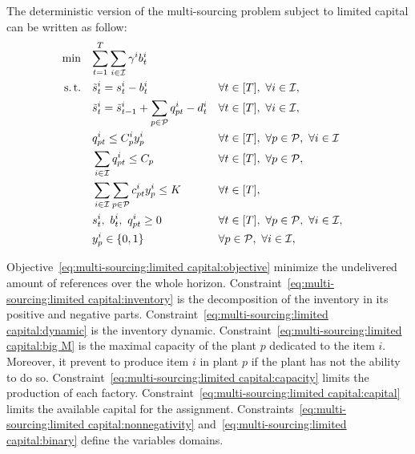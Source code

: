 The deterministic version of the multi-sourcing problem subject to limited capital can be written as follow:
\begin{subequations}\label{eq:multi-sourcing:limited capital}
  \begin{align}
    \min\quad & \rlap{$\ds \sum_{t=1}^{\horizon} \sum_{i\in\REF} \backorder^i \backlog_t^i$}
    \label{eq:multi-sourcing:limited capital:objective}
    \\
    \st\quad & \ds \level_t^i = \inventory_t^i - \backlog_t^i && \forall t\in\range{\horizon},\ \forall i\in\REF,
    \label{eq:multi-sourcing:limited capital:inventory}
    \\
    & \ds \level_t^i = \level_{t-1}^i + \sum_{p\in\plants}\quantity_{pt}^i - \demand_t^i && \forall t\in\range{\horizon},\ \forall i\in\REF,
    \label{eq:multi-sourcing:limited capital:dynamic}
    \\
    & \ds \quantity_{pt}^i \le \capacity_p^i \open_p^i && \forall t\in\range{\horizon},\ \forall p\in\plants,\ \forall i\in\REF
    \label{eq:multi-sourcing:limited capital:big M}
    \\
    & \ds \sum_{i\in\REF}\quantity_{pt}^i \le \capacity_p && \forall t\in\range{\horizon},\ \forall p\in\plants,
    \label{eq:multi-sourcing:limited capital:capacity}
    \\
    & \ds \sum_{i\in\REF} \sum_{p\in\plants}\affect_{pt}^i\open_p^i \le \capital && \forall t\in\range{\horizon},
    \label{eq:multi-sourcing:limited capital:capital}
    \\
    & \ds \inventory_t^i,\ \backlog_t^i,\ \quantity_{pt}^i \ge 0 && \forall t\in\range{\horizon},\ \forall p\in\plants,\ \forall i\in\REF,
    \label{eq:multi-sourcing:limited capital:nonnegativity}
    \\
    & \ds \open_p^i \in \crbracket{0,1} && \forall p\in\plants,\ \forall i\in\REF,
    \label{eq:multi-sourcing:limited capital:binary}
  \end{align}
\end{subequations}


Objective~\eqref{eq:multi-sourcing:limited capital:objective} minimize the undelivered amount of references over the whole horizon.
Constraint~\eqref{eq:multi-sourcing:limited capital:inventory} is the decomposition of the inventory in its positive and negative parts.
Constraint~\eqref{eq:multi-sourcing:limited capital:dynamic} is the inventory dynamic.
Constraint~\eqref{eq:multi-sourcing:limited capital:big M} is the maximal capacity of the plant $p$ dedicated to the item $i$. Moreover, it prevent to produce item $i$ in plant $p$ if the plant has not the ability to do so.
Constraint~\eqref{eq:multi-sourcing:limited capital:capacity} limits the production of each factory.
Constraint~\eqref{eq:multi-sourcing:limited capital:capital} limits the available capital for the assignment.
Constraints~\eqref{eq:multi-sourcing:limited capital:nonnegativity} and~\eqref{eq:multi-sourcing:limited capital:binary} define the variables domains.




